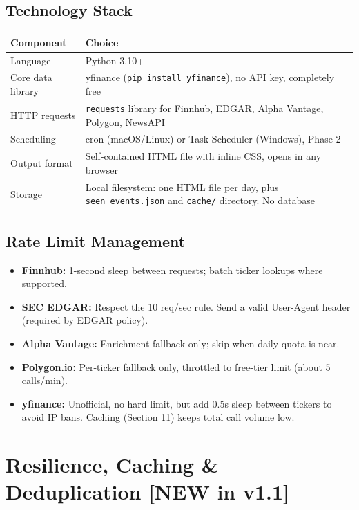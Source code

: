 \documentclass[11pt]{article}
\begin{document}
\subsection{Technology Stack}

\begin{tabularx}{\textwidth}{|L{3.6cm}|X|}
\hline
\textbf{Component} & \textbf{Choice} \\
\hline
Language & Python 3.10+ \\
\hline
Core data library & yfinance (\texttt{pip install yfinance}), no API key, completely free \\
\hline
HTTP requests & \texttt{requests} library for Finnhub, EDGAR, Alpha Vantage, Polygon, NewsAPI \\
\hline
Scheduling & cron (macOS/Linux) or Task Scheduler (Windows), Phase 2 \\
\hline
Output format & Self-contained HTML file with inline CSS, opens in any browser \\
\hline
Storage & Local filesystem: one HTML file per day, plus \texttt{seen\_events.json} and \texttt{cache/} directory. No database \\
\hline
\end{tabularx}

\subsection{Rate Limit Management}
\begin{itemize}
  \item \textbf{Finnhub:} 1-second sleep between requests; batch ticker lookups where supported.
  \item \textbf{SEC EDGAR:} Respect the 10 req/sec rule. Send a valid User-Agent header (required by EDGAR policy).
  \item \textbf{Alpha Vantage:} Enrichment fallback only; skip when daily quota is near.
  \item \textbf{Polygon.io:} Per-ticker fallback only, throttled to free-tier limit (about 5 calls/min).
  \item \textbf{yfinance:} Unofficial, no hard limit, but add 0.5s sleep between tickers to avoid IP bans. Caching (Section 11) keeps total call volume low.
\end{itemize}

\section{Resilience, Caching \& Deduplication \hfill {\small [NEW in v1.1]}}
\end{document}
